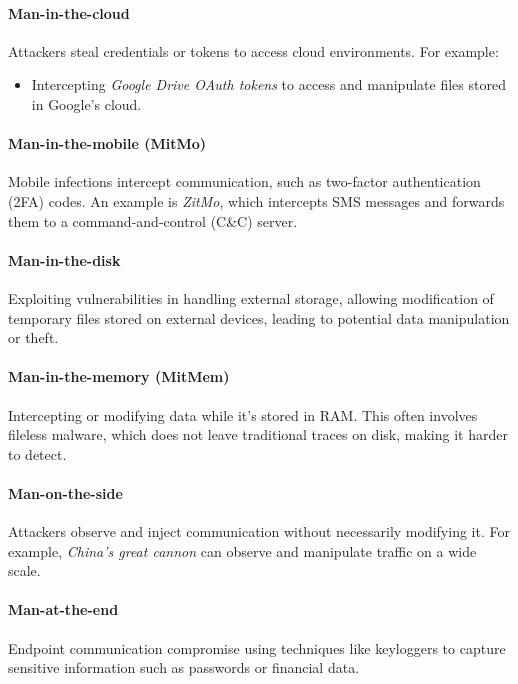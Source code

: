 \paragraph{Man-in-the-cloud}
Attackers steal credentials or tokens to access cloud environments.
For example:
\begin{itemize}
    \item Intercepting \textit{Google Drive OAuth tokens} to access
      and manipulate files stored in Google’s cloud.
\end{itemize}

\paragraph{Man-in-the-mobile (MitMo)}
Mobile infections intercept communication, such as two-factor
authentication (2FA) codes. An example is \textit{ZitMo}, which
intercepts SMS messages and forwards them to a command-and-control
(C\&C) server.

\paragraph{Man-in-the-disk}
Exploiting vulnerabilities in handling external storage, allowing
modification of temporary files stored on external devices, leading to
potential data manipulation or theft.

\paragraph{Man-in-the-memory (MitMem)}
Intercepting or modifying data while it's stored in RAM. This often
involves fileless malware, which does not leave traditional traces on
disk, making it harder to detect.

\paragraph{Man-on-the-side}
Attackers observe and inject communication without necessarily
modifying it. For example, \textit{China's great cannon} can observe
and manipulate traffic on a wide scale.

\paragraph{Man-at-the-end}
Endpoint communication compromise using techniques like keyloggers to
capture sensitive information such as passwords or financial data.
